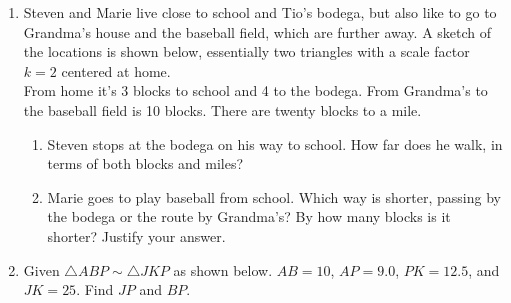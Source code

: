 \documentclass[12pt, twoside]{article}
\begin{document}
\begin{enumerate}
\newpage
\item Steven and Marie live close to school and Tio's bodega, but also like to go to Grandma's house and the baseball field, which are further away. A sketch of the locations is shown below, essentially two triangles with a scale factor $k=2$ centered at home.\\[0.25cm]
From home it's 3 blocks to school and 4 to the bodega. From Grandma's to the baseball field is 10 blocks. There are twenty blocks to a mile.
\begin{enumerate}
    \item Steven stops at the bodega on his way to school. How far does he walk, in terms of both blocks and miles?
        \begin{flushright}
        \end{flushright} 
    \item Marie goes to play baseball from school. Which way is shorter, passing by the bodega or the route by Grandma's? By how many blocks is it shorter? Justify your answer.
\end{enumerate} \vspace{4cm}

\item Given $\triangle ABP \sim \triangle JKP$ as shown below. $AB=10$, $AP=9.0$, $PK=12.5$, and $JK=25$. Find $JP$ and $BP$.
  \begin{flushright}
    \end{flushright}


\end{enumerate}
\end{document}
